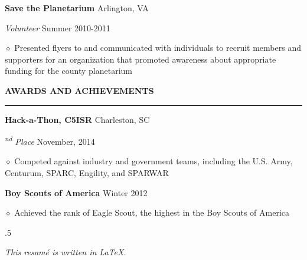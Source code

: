 \documentclass[executivepaper]{extarticle}
\begin{document}
\begin{center}
{\begin{minipage}{7.0in}
{\noindent \textbf{\fontsize{12}{8}\selectfont Save the Planetarium}} {\hfill \fontsize{10}{8}\selectfont Arlington, VA}

\vspace{0.25mm}

{\noindent \textit{\fontsize{12}{8}\selectfont Volunteer}} {\hfill \fontsize{10}{8}\selectfont Summer 2010-2011}

\vspace{0.25mm}

{\noindent $\diamond$ {\fontsize{12}{8}\selectfont Presented flyers to and communicated with individuals to recruit members and supporters for an organization that promoted awareness about appropriate funding
for the county planetarium}}

\vspace{3mm}


{\noindent \textbf{\fontsize{12}{9}\selectfont AWARDS AND ACHIEVEMENTS}}

\vspace{-3mm}

\noindent \rule{\textwidth}{0.5pt}

\vspace{1mm}

{\noindent \textbf{\fontsize{12}{8}\selectfont Hack-a-Thon, C5ISR}} {\hfill \fontsize{10}{8}\selectfont Charleston, SC}

{\noindent \textit{\fontsize{12}{8}\textsuperscript{nd} Place}} {\hfill \fontsize{10}{8}\selectfont November, 2014}

\vspace{0.25mm}

{\noindent $\diamond$ {\fontsize{12}{8}\selectfont Competed against industry and government teams, including the U.S. Army, Centurum, SPARC, Engility, and SPARWAR}}

\vspace{2mm}

{\noindent \textbf{\fontsize{12}{8}\selectfont Boy Scouts of America}} {\hfill \fontsize{10}{8}\selectfont Winter 2012}

\vspace{0.25mm}

{\noindent $\diamond$ {\fontsize{12}{8}\selectfont Achieved the rank of Eagle Scout, the highest in the Boy Scouts of America}}

\vspace{5mm}



\moveleft.5\hoffset\centerline{{\large\sl This resumé is written in \LaTeX.}}

\end{minipage}

}

\end{center}
\end{document}

